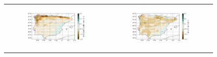 \begin{figure}[htbp]
    \centering
    \begin{tabular}{cc}
        \begin{subfigure}[b]{0.5\textwidth}
            \caption{}
            \includegraphics[width=\textwidth]{images/chap4/future/diffmap_precip_presfut.png}
        \end{subfigure} &
        \begin{subfigure}[b]{0.5\textwidth}
            \caption{}
            \includegraphics[width=\textwidth]{images/chap4/future/diffmap_evap_presfut.png}
        \end{subfigure} \\


\end{tabular}
\end{figure}
